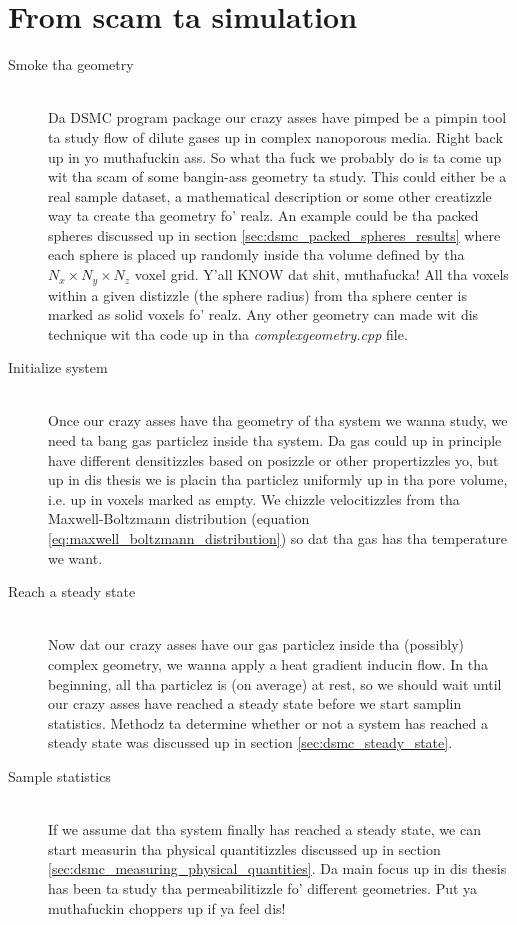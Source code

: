 \section{From scam ta simulation}
\begin{description}
  \item[Smoke tha geometry] \hfill \\
Da DSMC program package our crazy asses have pimped be a pimpin tool ta study flow of dilute gases up in complex nanoporous media. Right back up in yo muthafuckin ass. So what tha fuck we probably do is ta come up wit tha scam of some bangin-ass geometry ta study. This could either be a real sample dataset, a mathematical description or some other creatizzle way ta create tha geometry fo' realz. An example could be tha packed spheres discussed up in section \ref{sec:dsmc_packed_spheres_results} where each sphere is placed up randomly inside tha volume defined by tha $N_x\times N_y \times N_z$ voxel grid. Y'all KNOW dat shit, muthafucka! All tha voxels within a given distizzle (the sphere radius) from tha sphere center is marked as solid voxels fo' realz. Any other geometry can made wit dis technique wit tha code up in tha \textit{complexgeometry.cpp} file. 
\item[Initialize system] \hfill \\
Once our crazy asses have tha geometry of tha system we wanna study, we need ta bang gas particlez inside tha system. Da gas could up in principle have different densitizzles based on posizzle or other propertizzles yo, but up in dis thesis we is placin tha particlez uniformly up in tha pore volume, i.e. up in voxels marked as empty. We chizzle velocitizzles from tha Maxwell-Boltzmann distribution (equation \eqref{eq:maxwell_boltzmann_distribution}) so dat tha gas has tha temperature we want.
\item[Reach a steady state] \hfill \\
Now dat our crazy asses have our gas particlez inside tha (possibly) complex geometry, we wanna apply a heat gradient inducin flow. In tha beginning, all tha particlez is (on average) at rest, so we should wait until our crazy asses have reached a steady state before we start samplin statistics. Methodz ta determine whether or not a system has reached a steady state was discussed up in section \ref{sec:dsmc_steady_state}. 
\item[Sample statistics] \hfill \\
If we assume dat tha system finally has reached a steady state, we can start measurin tha physical quantitizzles discussed up in section \ref{sec:dsmc_measuring_physical_quantities}. Da main focus up in dis thesis has been ta study tha permeabilitizzle fo' different geometries. Put ya muthafuckin choppers up if ya feel dis! 
\end{description}

